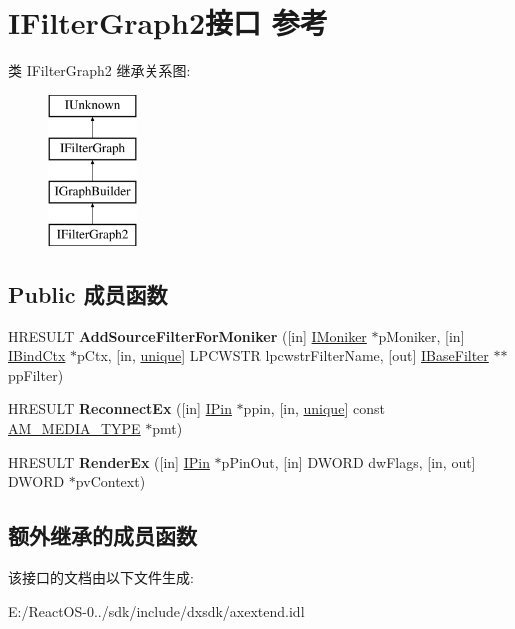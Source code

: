 \hypertarget{interface_i_filter_graph2}{}\section{I\+Filter\+Graph2接口 参考}
\label{interface_i_filter_graph2}
类 I\+Filter\+Graph2 继承关系图\+:\begin{figure}[H]
\begin{center}
\leavevmode
\includegraphics[height=4.000000cm]{interface_i_filter_graph2}
\end{center}
\end{figure}
\subsection*{Public 成员函数}
\begin{DoxyCompactItemize}
\item 
\mbox{\label{interface_i_filter_graph2_a4901154142a0b45ca5e7919c359fe42d}} 
H\+R\+E\+S\+U\+LT {\bfseries Add\+Source\+Filter\+For\+Moniker} (\mbox{[}in\mbox{]} \hyperlink{interface_i_moniker}{I\+Moniker} $\ast$p\+Moniker, \mbox{[}in\mbox{]} \hyperlink{interface_i_bind_ctx}{I\+Bind\+Ctx} $\ast$p\+Ctx, \mbox{[}in, \hyperlink{interfaceunique}{unique}\mbox{]} L\+P\+C\+W\+S\+TR lpcwstr\+Filter\+Name, \mbox{[}out\mbox{]} \hyperlink{interface_i_base_filter}{I\+Base\+Filter} $\ast$$\ast$pp\+Filter)
\item 
\mbox{\label{interface_i_filter_graph2_ad2bbac5f44f0683e5d6fa937bcfb8fe4}} 
H\+R\+E\+S\+U\+LT {\bfseries Reconnect\+Ex} (\mbox{[}in\mbox{]} \hyperlink{interface_i_pin}{I\+Pin} $\ast$ppin, \mbox{[}in, \hyperlink{interfaceunique}{unique}\mbox{]} const \hyperlink{struct_a_m___m_e_d_i_a___t_y_p_e}{A\+M\+\_\+\+M\+E\+D\+I\+A\+\_\+\+T\+Y\+PE} $\ast$pmt)
\item 
\mbox{\label{interface_i_filter_graph2_a648759810f84b6d3072e2e0662cdcda1}} 
H\+R\+E\+S\+U\+LT {\bfseries Render\+Ex} (\mbox{[}in\mbox{]} \hyperlink{interface_i_pin}{I\+Pin} $\ast$p\+Pin\+Out, \mbox{[}in\mbox{]} D\+W\+O\+RD dw\+Flags, \mbox{[}in, out\mbox{]} D\+W\+O\+RD $\ast$pv\+Context)
\end{DoxyCompactItemize}
\subsection*{额外继承的成员函数}


该接口的文档由以下文件生成\+:\begin{DoxyCompactItemize}
\item 
E\+:/\+React\+O\+S-\/0../sdk/include/dxsdk/axextend.\+idl\end{DoxyCompactItemize}
